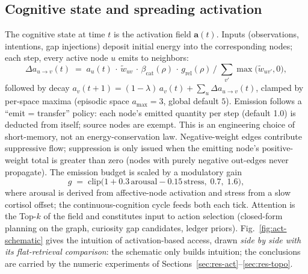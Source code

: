 \documentclass[10pt,a4paper]{article}
\begin{document}
\subsection{Cognitive state and spreading activation}
\label{sec:arch-act}
The cognitive state at time $t$ is the activation field $\mathbf{a}(t)$. Inputs (observations, intentions, gap injections) deposit initial energy into the corresponding nodes; each step, every active node $u$ emits to neighbors:
\begin{equation}
\Delta a_{u\rightarrow v}(t) \;=\; a_u(t)\,\cdot\, \tilde w_{uv}\,\cdot\, \beta_{\mathrm{cat}}(\rho)\,\cdot\, g_{\mathrm{rel}}(\rho)\,\Big/\; \textstyle\sum_{v'} \max\big(\tilde w_{uv'},0\big),
\label{eq:spread}
\end{equation}
followed by decay $a_v(t{+}1) = (1-\lambda)\,a_v(t) + \sum_u \Delta a_{u\rightarrow v}(t)$, clamped by per-space maxima (episodic space $a_{\max}{=}3$, global default $5$). Emission follows a ``emit = transfer'' policy: each node's emitted quantity per step (default 1.0) is deducted from itself; source nodes are exempt. This is an engineering choice of short-memory, not an energy-conservation law. Negative-weight edges contribute suppressive flow; suppression is only issued when the emitting node's positive-weight total is greater than zero (nodes with purely negative out-edges never propagate). The emission budget is scaled by a modulatory gain
\begin{equation}
g \;=\; \mathrm{clip}\big(1 + 0.3\,\mathrm{arousal} - 0.15\,\mathrm{stress},\; 0.7,\; 1.6\big),
\label{eq:mod}
\end{equation}
where arousal is derived from affective-node activation and stress from a slow cortisol offset; the continuous-cognition cycle feeds both each tick. Attention is the Top-$k$ of the field and constitutes input to action selection (closed-form planning on the graph, curiosity gap candidates, ledger priors). Fig.~\ref{fig:act-schematic} gives the intuition of activation-based access, drawn \emph{side by side with its flat-retrieval comparison}: the schematic only builds intuition; the conclusions are carried by the numeric experiments of Sections~\ref{sec:res-act}--\ref{sec:res-topo}.
\end{document}
